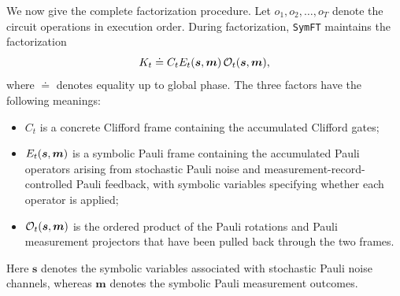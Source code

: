 \documentclass[a4paper,onecolumn,unpublished]{quantumarticle}
\DeclarePairedDelimiter\rbra{\lparen}{\rparen}
\newcommand{\tFont}[1]{\texttt{#1}}
\newcommand{\symft}{\tFont{SymFT}}
\newcommand{\cO}{\mathcal{O}}
\begin{document}
We now give the complete factorization procedure.
Let $o_1,o_2,\ldots,o_T$ denote the circuit operations in execution order.
During factorization, \symft{} maintains the factorization
\begin{equation}\label{eq:factorization-invariant}
    K_t \doteq C_t E_t\rbra{\bm{s},\bm{m}}\,
    \cO_t\rbra{\bm{s},\bm{m}},
\end{equation}
where $\doteq$ denotes equality up to global phase.
The three factors have the following meanings:
\begin{itemize}
    \item $C_t$ is a concrete Clifford frame containing the accumulated Clifford gates;
    \item $E_t\rbra{\bm{s},\bm{m}}$ is a symbolic Pauli frame containing the accumulated Pauli operators arising from stochastic Pauli noise and measurement-record-controlled Pauli feedback, with symbolic variables specifying whether each operator is applied;
    \item $\cO_t\rbra{\bm{s},\bm{m}}$ is the ordered product of the Pauli rotations and Pauli measurement projectors that have been pulled back through the two frames.
\end{itemize}
Here $\bm{s}$ denotes the symbolic variables associated with stochastic Pauli noise channels, whereas $\bm{m}$ denotes the symbolic Pauli measurement outcomes.
\end{document}

